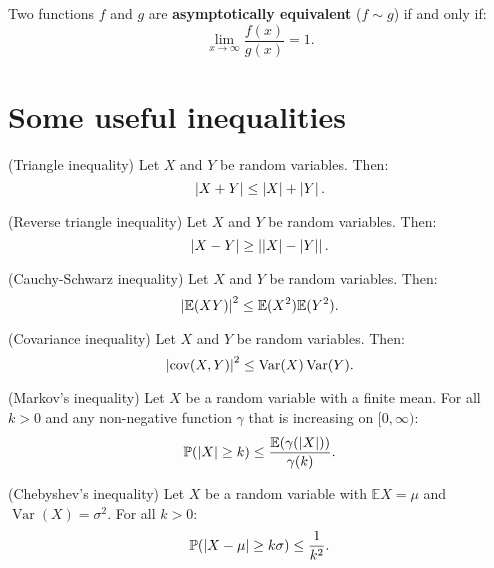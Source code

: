 \documentclass{huhtakm-template-book}
\newcommand{\prob}{\mathbb{P}}
\newcommand{\expect}{\mathbb{E}}
\DeclareMathOperator{\Var}{Var}
\DeclareMathOperator{\cov}{cov}
\begin{document}
    \begin{defn}
        Two functions $f$ and $g$ are \textbf{asymptotically equivalent} ($f\sim g$) if and only if:
        \begin{equation*}
            \lim_{x\to\infty}\frac{f(x)}{g(x)}=1.
        \end{equation*}
    \end{defn}
	
\chapter{Some useful inequalities}
    \begin{thm}(Triangle inequality)
        Let $X$ and $Y$ be random variables. Then:
        \begin{equation*}
            \left|{X+Y}\right|\leq\left|{X}\right|+\left|{Y}\right|.
        \end{equation*}
    \end{thm}
    \begin{thm}(Reverse triangle inequality)
        Let $X$ and $Y$ be random variables. Then:
        \begin{equation*}
            \left|{X-Y}\right|\geq\left|{\left|{X}\right|-\left|{Y}\right|}\right|.
        \end{equation*}
    \end{thm}
    \begin{thm}(Cauchy-Schwarz inequality)
        Let $X$ and $Y$ be random variables. Then:
        \begin{equation*}
            \abs{\expect(XY)}^{2}\leq\expect(X^{2})\expect(Y^{2}).
        \end{equation*}
    \end{thm}
    \begin{thm}(Covariance inequality)
        Let $X$ and $Y$ be random variables. Then:
        \begin{equation*}
            \abs{\cov(X,Y)}^{2}\leq\Var(X)\Var(Y).
        \end{equation*}
    \end{thm}
    \begin{thm}(Markov's inequality)
        Let $X$ be a random variable with a finite mean. For all $k>0$ and any non-negative function $\gamma$ that is increasing on $[0,\infty)$:
        \begin{equation*}
            \prob(\abs{X}\geq k)\leq\frac{\expect(\gamma(\abs{X}))}{\gamma(k)}.
        \end{equation*}
    \end{thm}
    \begin{thm}(Chebyshev's inequality)
        Let $X$ be a random variable with $\expect X=\mu$ and $\Var(X)=\sigma^{2}$. For all $k>0$:
        \begin{equation*}
            \prob(\abs{X-\mu}\geq k\sigma)\leq\frac{1}{k^{2}}.
        \end{equation*}
    \end{thm}
\end{document}
